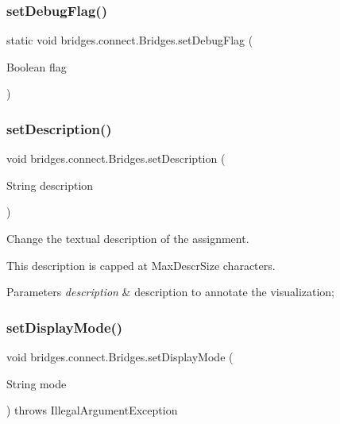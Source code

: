 \subsubsection{\texorpdfstring{setDebugFlag()}{setDebugFlag()}}
{\footnotesize\ttfamily static void bridges.\+connect.\+Bridges.\+set\+Debug\+Flag (\begin{DoxyParamCaption}\item[{Boolean}]{flag }\end{DoxyParamCaption})\hspace{0.3cm}{\ttfamily [static]}}

\mbox{\label{classbridges_1_1connect_1_1_bridges_a50d1d5aa64d312393b63d1be854e34a2}} 
\subsubsection{\texorpdfstring{setDescription()}{setDescription()}}
{\footnotesize\ttfamily void bridges.\+connect.\+Bridges.\+set\+Description (\begin{DoxyParamCaption}\item[{String}]{description }\end{DoxyParamCaption})}



Change the textual description of the assignment. 

This description is capped at Max\+Descr\+Size characters.


\begin{DoxyParams}{Parameters}
{\em description} & description to annotate the visualization; \\
\hline
\end{DoxyParams}
\mbox{\label{classbridges_1_1connect_1_1_bridges_aaa1a44a689daa26a841d0e8d31839861}} 
\subsubsection{\texorpdfstring{setDisplayMode()}{setDisplayMode()}}
{\footnotesize\ttfamily void bridges.\+connect.\+Bridges.\+set\+Display\+Mode (\begin{DoxyParamCaption}\item[{String}]{mode }\end{DoxyParamCaption}) throws Illegal\+Argument\+Exception}

